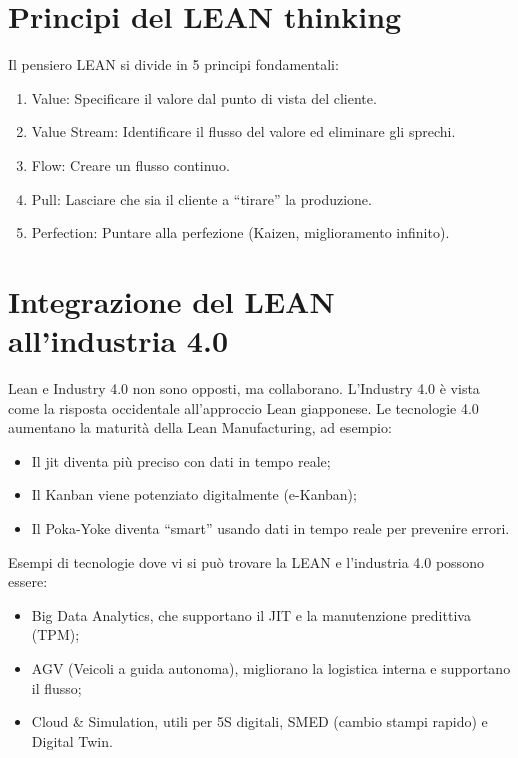 %
\section{Principi del LEAN thinking}
Il pensiero LEAN si divide in 5 principi fondamentali:
\begin{enumerate}
    \item Value: Specificare il valore dal punto di vista del cliente.
    \item Value Stream: Identificare il flusso del valore ed eliminare gli sprechi.
    \item Flow: Creare un flusso continuo.
    \item Pull: Lasciare che sia il cliente a ``tirare'' la produzione.
    \item Perfection: Puntare alla perfezione (Kaizen, miglioramento infinito).
\end{enumerate}

%
\section{Integrazione del LEAN all'industria 4.0}
Lean e Industry 4.0 non sono opposti, ma collaborano. L'Industry 4.0 è vista come la risposta occidentale all'approccio Lean giapponese.
Le tecnologie 4.0 aumentano la maturità della Lean Manufacturing, ad esempio:
\begin{itemize}
    \item Il \gls{jit} diventa più preciso con dati in tempo reale;
    \item Il Kanban viene potenziato digitalmente (e-Kanban);
    \item Il Poka-Yoke diventa ``smart'' usando dati in tempo reale per prevenire errori.
\end{itemize}
\begin{example}
    Esempi di tecnologie dove vi si può trovare la LEAN e l'industria 4.0 possono essere:
    \begin{itemize}
        \item Big Data Analytics, che supportano il JIT e la manutenzione predittiva (TPM);
        \item AGV (Veicoli a guida autonoma), migliorano la logistica interna e supportano il flusso;
        \item Cloud \& Simulation, utili per 5S digitali, SMED (cambio stampi rapido) e Digital Twin.
    \end{itemize}
\end{example}


